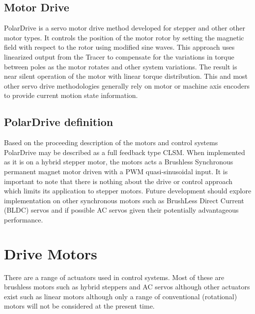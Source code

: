 \documentclass{article}
\begin{document}
\subsection{Motor Drive}
PolarDrive is a servo motor drive method developed for stepper and other other motor types. It controls the position of the motor rotor by setting the magnetic field with respect to the rotor using modified sine waves. This approach uses linearized output from the Tracer to compensate for the variations in torque between poles as the motor rotates and other system variations. The result is near silent operation of the motor with linear torque distribution. This and most other servo drive methodologies generally rely on motor or machine axis encoders to provide current motion state information.  
\subsection{PolarDrive definition}
Based on the proceeding description of the motors and control systems PolarDrive may be described as a full feedback type CLSM. When implemented as it is on a hybrid stepper motor, the motors acts a Brushless Synchronous permanent magnet motor driven with a PWM quasi-sinusoidal input. It is important to note that there is nothing about the drive or control approach which limits its application to stepper motors. Future development should explore implementation on other synchronous motors such as BrushLess Direct Current (BLDC) servos and if possible AC servos given their potentially advantageous performance. 

\section{Drive Motors}
There are a range of actuators used in control systems. Most of these are brushless motors such as hybrid steppers and AC servos although other actuators exist such as linear motors although only a range of conventional (rotational) motors will not be considered at the present time. 
\end{document}
